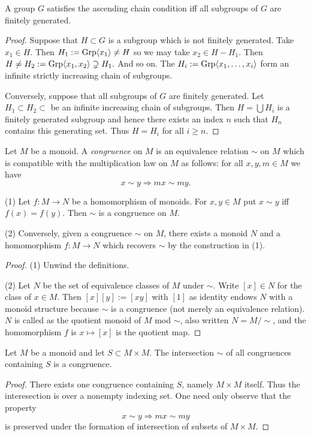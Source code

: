 \begin{prop} A group $G$ satisfies the ascending chain condition iff all
    subgroups of $G$ are finitely generated.
\end{prop}
\begin{proof} Suppose that $H \subset G $ is a subgroup which is not finitely
    generated. Take $x_1\in H$. Then $H_1 := \mathrm{Grp}\langle x_1\rangle \neq H$ so we may take
    $x_2\in H - H_1$. Then $H \neq H_2 := \mathrm{Grp}\langle x_1,x_2\rangle \supsetneq H_1.$ And so
    on. The $H_i := \mathrm{Grp}\langle x_1,\dots,x_i\rangle$ form an infinite strictly increasing
    chain of subgroups.

    Conversely, suppose that all subgroups of $G$ are finitely generated. Let
    $H_1 \subset H_2 \subset $ be an infinite increasing chain of subgroups.
    Then $H = \bigcup H_i$ is a finitely generated subgroup and hence there
    exists an index $n$ such that $H_n$ contains this generating set. Thus $H =
    H_i$ for all $i \ge n.$
\end{proof}

\begin{defn} Let $M$ be a monoid. A \emph{congruence} on $M$ is an equivalence
    relation $\sim$ on $M$ which is compatible with the multiplication law on
    $M$ as follows: for all $x,y,m\in M$ we have \[x \sim y \Rightarrow mx \sim
    my.\]
\end{defn}

\begin{prop} (1) Let $f: M \rightarrow N$ be a homomorphism of monoids. For
    $x,y\in M$ put $x\sim y$ iff $f(x) = f(y)$. Then $\sim$ is a congruence on
    $M$.

    (2) Conversely, given a congruence $\sim$ on $M$, there exists a monoid $N$
    and a homomorphism $f : M \rightarrow N$ which recovers $\sim$ by the
    construction in (1).
\end{prop}
\begin{proof} (1) Unwind the definitions.

    (2) Let $N$ be the set of equivalence classes of $M$ under $\sim$. Write
    $[x] \in N$ for the class of $x\in M$. Then $[x][y] := [xy]$ with $[1]$ as
    identity endows $N$ with a monoid structure because $\sim$ is a congruence
    (not merely an equivalence relation). $N$ is called as the quotient monoid
    of $M$ mod $\sim$, also written $N = M/\sim$, and the homomorphism $f$ is
    $x \mapsto [x]$ is the quotient map.
\end{proof}

\begin{prop} Let $M$ be a monoid and let $S \subset M\times M$. The
    intersection $\sim$ of all congruences containing $S$ is a congruence.
\end{prop}
\begin{proof} There exists one congruence containing $S$, namely $M\times M$
    itself. Thus the interesection is over a nonempty indexing set. One need
    only observe that the property \[x \sim y \Rightarrow mx \sim my\] is
    preserved under the formation of intersection of subsets of $M\times M$.
\end{proof}

